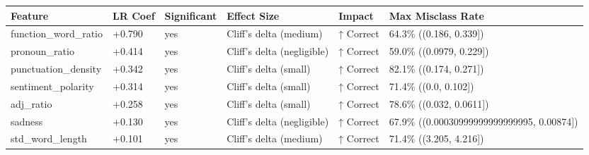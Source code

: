 \begin{tabular}{llllll}
\toprule
Feature & LR Coef & Significant & Effect Size & Impact & Max Misclass Rate \\
\midrule
function\_word\_ratio & +0.790 & yes & Cliff's delta (medium) & ↑ Correct & 64.3\% ((0.186, 0.339]) \\
pronoun\_ratio & +0.414 & yes & Cliff's delta (negligible) & ↑ Correct & 59.0\% ((0.0979, 0.229]) \\
punctuation\_density & +0.342 & yes & Cliff's delta (small) & ↑ Correct & 82.1\% ((0.174, 0.271]) \\
sentiment\_polarity & +0.314 & yes & Cliff's delta (small) & ↑ Correct & 71.4\% ((0.0, 0.102]) \\
adj\_ratio & +0.258 & yes & Cliff's delta (small) & ↑ Correct & 78.6\% ((0.032, 0.0611]) \\
sadness & +0.130 & yes & Cliff's delta (negligible) & ↑ Correct & 67.9\% ((0.00030999999999999995, 0.00874]) \\
std\_word\_length & +0.101 & yes & Cliff's delta (medium) & ↑ Correct & 71.4\% ((3.205, 4.216]) \\
\bottomrule
\end{tabular}
